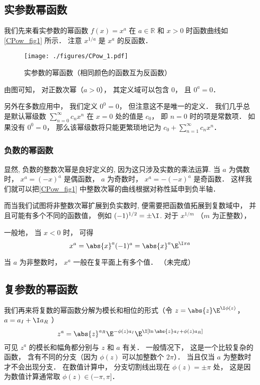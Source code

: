 

\subsection{实参数幂函数}
我们先来看实参数的幂函数 $f(x) = x^a$ 在 $a\in\mathbb R$ 和 $x > 0$ 时函数曲线如\autoref{CPow_fig1} 所示． 注意 $x^{1/a}$ 是 $x^a$ 的反函数．
\begin{figure}[ht]
\centering
\texttt{[image: ./figures/CPow\_1.pdf]}
\caption{实参数的幂函数（相同颜色的函数互为反函数）} \label{CPow_fig1}
\end{figure}

由图可知， 对正数次幂（$a > 0$）， 其定义域可以包含 $0$， 且 $0^a = 0$．

另外在多数应用中， 我们定义 $0^0 = 0$， 但注意这不是唯一的定义． 我们几乎总是默认幂级数 $\sum_{n=0}^\infty c_n x^n$ 在 $x = 0$ 处的值是 $c_0$， 即 $n=0$ 时的项是常数项． 如果没有 $0^0 = 0$， 那么该幂级数将只能更繁琐地记为 $c_0 + \sum_{n=1}^\infty c_n x^n$．

\subsubsection{负数的幂函数}
显然, 负数的整数次幂是良好定义的, 因为这只涉及实数的乘法运算. 当 $a$ 为偶数时， $x^a = (-x)^a$ 是偶函数， $a$ 为奇数时， $x^a = -(-x)^a$ 是奇函数． 这样我们就可以把\autoref{CPow_fig1} 中整数次幂的曲线根据对称性延申到负半轴．

而当我们试图将非整数次幂扩展到负实数时, 便需要把函数值拓展到复数域中， 并且可能有多个不同的函数值， 例如 $(-1)^{1/2} = \pm\I$.  对于 $x^{1/m}$ （$m$ 为正整数）， 

一般地， 当 $x < 0$ 时， 可得
\begin{equation}
x^a = \abs{x}^a (-1)^a = \abs{x}^a\E^{\I\pi a}
\end{equation}


当 $a$ 为非整数时， $x^a$ 一般在复平面上有多个值． （未完成）

\subsection{复参数的幂函数}
我们再来将复数的幂函数分解为模长和相位的形式（令 $z = \abs{z} \E^{\I\phi(z)}$， $a = a_I + \I a_R$ ）
\begin{equation}
z^a = \abs{z}^{a_R} \E^{-\phi(z) a_I} \E^{\I[\ln\abs{z}a_I + \phi(z)a_R]}
\end{equation}
可见 $z^a$ 的模长和幅角都分别与 $z$ 和 $a$ 有关． 一般情况下， 这是一个比较复杂的函数， 含有不同的分支（因为 $\phi(z)$ 可以加整数个 $2\pi$）．%
当且仅当 $a$ 为整数时才不会出现分支． 在数值计算中， 分支切割线出现在 $\phi(z) = \pm\pi$ 处， 这是因为数值计算通常取 $\phi(z)\in(-\pi, \pi]$．

